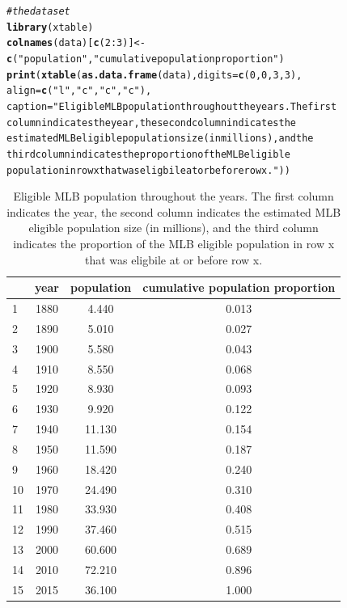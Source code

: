 \documentclass[11pt]{article}\usepackage[]{graphicx}\usepackage[]{color}
\makeatletter
\newcommand{\hlnum}[1]{\textcolor[rgb]{0.686,0.059,0.569}{#1}}%
\newcommand{\hlstr}[1]{\textcolor[rgb]{0.192,0.494,0.8}{#1}}%
\newcommand{\hlcom}[1]{\textcolor[rgb]{0.678,0.584,0.686}{\textit{#1}}}%
\newcommand{\hlopt}[1]{\textcolor[rgb]{0,0,0}{#1}}%
\newcommand{\hlstd}[1]{\textcolor[rgb]{0.345,0.345,0.345}{#1}}%
\newcommand{\hlkwb}[1]{\textcolor[rgb]{0.69,0.353,0.396}{#1}}%
\newcommand{\hlkwc}[1]{\textcolor[rgb]{0.333,0.667,0.333}{#1}}%
\newcommand{\hlkwd}[1]{\textcolor[rgb]{0.737,0.353,0.396}{\textbf{#1}}}%
\newenvironment{kframe}{%
 \def\at@end@of@kframe{}%
 \ifinner\ifhmode%
  \def\at@end@of@kframe{\end{minipage}}%
  \begin{minipage}{\columnwidth}%
 \fi\fi%
 \def\FrameCommand##1{\hskip\@totalleftmargin \hskip-\fboxsep
 \colorbox{shadecolor}{##1}\hskip-\fboxsep
     \hskip-\linewidth \hskip-\@totalleftmargin \hskip\columnwidth}%
 \MakeFramed {\advance\hsize-\width
   \@totalleftmargin\z@ \linewidth\hsize
   \@setminipage}}%
 {\par\unskip\endMakeFramed%
 \at@end@of@kframe}
\makeatother
\begin{document}
\begin{kframe}
\begin{alltt}
\hlcom{# the dataset}
\hlkwd{library}\hlstd{(xtable)}
\hlkwd{colnames}\hlstd{(data)[}\hlkwd{c}\hlstd{(}\hlnum{2}\hlopt{:}\hlnum{3}\hlstd{)]} \hlkwb{<-} \hlkwd{c}\hlstd{(}\hlstr{"population"}\hlstd{,} \hlstr{"cumulative population proportion"}\hlstd{)}
\hlkwd{print}\hlstd{(}\hlkwd{xtable}\hlstd{(}\hlkwd{as.data.frame}\hlstd{(data),} \hlkwc{digits} \hlstd{=} \hlkwd{c}\hlstd{(}\hlnum{0}\hlstd{,}\hlnum{0}\hlstd{,}\hlnum{3}\hlstd{,}\hlnum{3}\hlstd{),}
  \hlkwc{align} \hlstd{=} \hlkwd{c}\hlstd{(}\hlstr{"l"}\hlstd{,}\hlstr{"c"}\hlstd{,}\hlstr{"c"}\hlstd{,}\hlstr{"c"}\hlstd{),}
  \hlkwc{caption} \hlstd{=} \hlstr{"Eligible MLB population throughout the years. The first 
    column indicates the year, the second column indicates the 
    estimated MLB eligible population size (in millions), and the 
    third column indicates the proportion of the MLB eligible  
    population in row x that was eligbile at or before row x."}\hlstd{))}
\end{alltt}
\end{kframe}%
\begin{table}[ht]
\centering
\begin{tabular}{lccc}
  \hline
 & year & population & cumulative population proportion \\ 
  \hline
1 & 1880 & 4.440 & 0.013 \\ 
  2 & 1890 & 5.010 & 0.027 \\ 
  3 & 1900 & 5.580 & 0.043 \\ 
  4 & 1910 & 8.550 & 0.068 \\ 
  5 & 1920 & 8.930 & 0.093 \\ 
  6 & 1930 & 9.920 & 0.122 \\ 
  7 & 1940 & 11.130 & 0.154 \\ 
  8 & 1950 & 11.590 & 0.187 \\ 
  9 & 1960 & 18.420 & 0.240 \\ 
  10 & 1970 & 24.490 & 0.310 \\ 
  11 & 1980 & 33.930 & 0.408 \\ 
  12 & 1990 & 37.460 & 0.515 \\ 
  13 & 2000 & 60.600 & 0.689 \\ 
  14 & 2010 & 72.210 & 0.896 \\ 
  15 & 2015 & 36.100 & 1.000 \\ 
   \hline
\end{tabular}
\caption{Eligible MLB population throughout the years. The first 
    column indicates the year, the second column indicates the 
    estimated MLB eligible population size (in millions), and the 
    third column indicates the proportion of the MLB eligible  
    population in row x that was eligbile at or before row x.} 
\end{table}
\end{document}
